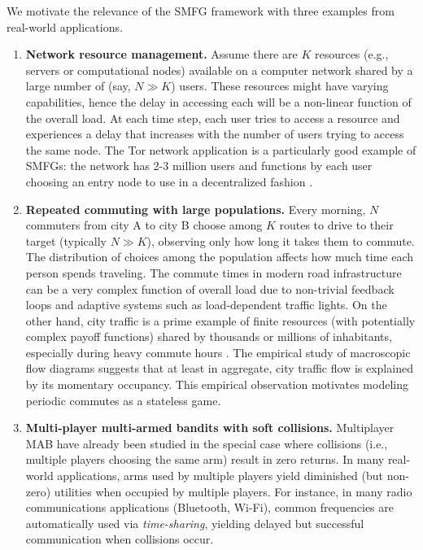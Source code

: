 We motivate the relevance of the SMFG framework with three examples from real-world applications.
\begin{enumerate}
    \item \textbf{Network resource management.}
Assume there are $K$ resources (e.g., servers or computational nodes) available on a computer network shared by a large number of (say, $N \gg K$) users.
These resources might have varying capabilities, hence the delay in accessing each will be a non-linear function of the overall load.
At each time step, each user tries to access a resource and experiences a delay that increases with the number of users trying to access the same node.
The Tor network application is a particularly good example of SMFGs: the network has 2-3 million users and functions by each user choosing an entry node to use in a decentralized fashion \citep{tormainpage}.

    \item \textbf{Repeated commuting with large populations.}
Every morning, $N$ commuters from city A to city B choose among $K$ routes to drive to their target (typically $N \gg K$), observing only how long it takes them to commute.
The distribution of choices among the population affects how much time each person spends traveling.
The commute times in modern road infrastructure can be a very complex function of overall load \citep{hoogendoorn2013traffic} due to non-trivial feedback loops and adaptive systems such as load-dependent traffic lights.
On the other hand, city traffic is a prime example of finite resources (with potentially complex payoff functions) shared by thousands or millions of inhabitants, especially during heavy commute hours \citep{ambuhl2017empirical}. 
    The empirical study of macroscopic flow diagrams \citep{geroliminis2008existence, ambuhl2017empirical} suggests that at least in aggregate, city traffic flow is explained by its momentary occupancy.
    This empirical observation motivates modeling periodic commutes as a stateless game.
\item \textbf{Multi-player multi-armed bandits with soft collisions.}
Multiplayer MAB have already been studied in the special case where collisions (i.e., multiple players choosing the same arm) result in zero returns.
In many real-world applications, arms used by multiple players yield diminished (but non-zero) utilities when occupied by multiple players.
For instance, in many radio communications applications (Bluetooth, Wi-Fi), common frequencies are automatically used via \emph{time-sharing}, yielding delayed but successful communication when collisions occur.

    
\end{enumerate}

